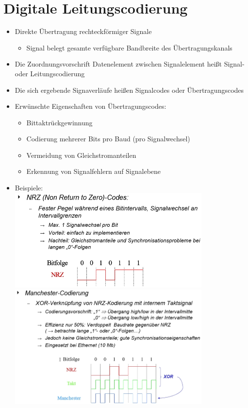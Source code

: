 \documentclass{scrreprt}
\begin{document}
\section{Digitale Leitungscodierung}
\label{sec:Leitungscodierung}
\begin{itemize}
	\item Direkte Übertragung rechteckförmiger Signale
	      \begin{itemize}
		      \item Signal belegt gesamte verfügbare Bandbreite des Übertragungskanals
	      \end{itemize}
	\item Die Zuordnungsvorschrift Datenelement zwischen Signalelement heißt Signal- oder Leitungscodierung
	\item Die sich ergebende Signaverläufe heißen Signalcodes oder Übertragungscodes
	\item Erwünschte Eigenschaften von Übertragungscodes:
	      \begin{itemize}
		      \item Bittaktrückgewinnung
		      \item Codierung mehrerer Bits pro Baud (pro Signalwechsel)
		      \item Vermeidung von Gleichstromanteilen
		      \item Erkennung von Signalfehlern auf Signalebene
	      \end{itemize}
	\item Beispiele: 
		  \\
	      \includegraphics[width=0.80\textwidth]{"graphics/NRZ"}
	      \\
	      \includegraphics[width=0.80\textwidth]{"graphics/Manchester"}

\end{itemize}
\end{document}
